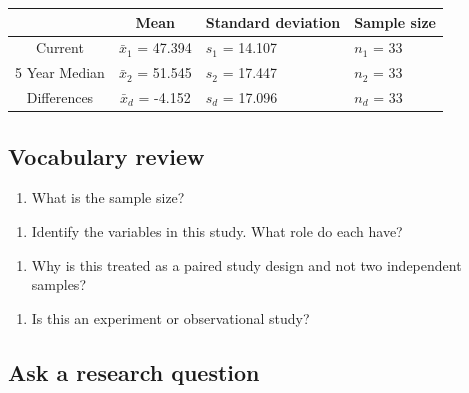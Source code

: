 \documentclass[
]{report}
\providecommand{\tightlist}{%
  \setlength{\itemsep}{0pt}\setlength{\parskip}{0pt}}
\begin{document}
\begin{longtable}[]{@{}ccll@{}}
\toprule
& Mean & Standard deviation & Sample size\tabularnewline
\midrule
\endhead
Current & \(\bar{x}_1\) = 47.394 & \(s_1\) = 14.107 & \(n_1\) = 33\tabularnewline
5 Year Median & \(\bar{x}_2\) = 51.545 & \(s_2\) = 17.447 & \(n_2\) = 33\tabularnewline
Differences & \(\bar{x}_d\) = -4.152 & \(s_d\) = 17.096 & \(n_d\) = 33\tabularnewline
\bottomrule
\end{longtable}

\newpage

\hypertarget{vocabulary-review}{%
\subsection{Vocabulary review}\label{vocabulary-review}}

\begin{enumerate}
\def\labelenumi{\arabic{enumi}.}
\tightlist
\item
  What is the sample size?
\end{enumerate}

\vspace{0.5in}

\begin{enumerate}
\def\labelenumi{\arabic{enumi}.}
\setcounter{enumi}{1}
\tightlist
\item
  Identify the variables in this study. What role do each have?
\end{enumerate}

\vspace{.8in}

\begin{enumerate}
\def\labelenumi{\arabic{enumi}.}
\setcounter{enumi}{2}
\tightlist
\item
  Why is this treated as a paired study design and not two independent samples?
\end{enumerate}

\vspace{1in}

\begin{enumerate}
\def\labelenumi{\arabic{enumi}.}
\setcounter{enumi}{3}
\tightlist
\item
  Is this an experiment or observational study?
\end{enumerate}

\vspace{0.3in}

\hypertarget{ask-a-research-question}{%
\subsection{Ask a research question}\label{ask-a-research-question}}
\end{document}
